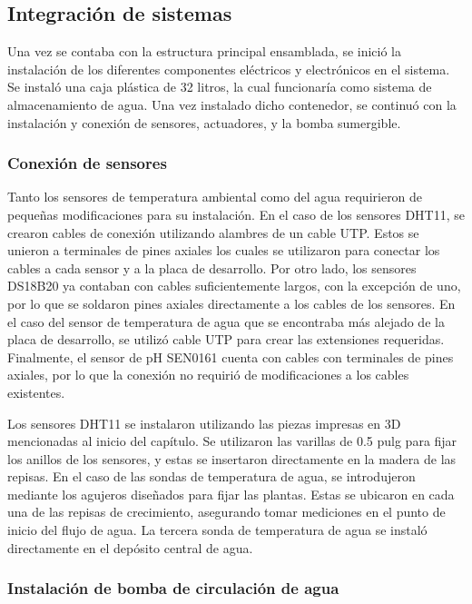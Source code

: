 \subsection{Integración de sistemas}

Una vez se contaba con la estructura principal ensamblada, se inició la instalación de los diferentes componentes eléctricos y electrónicos en el sistema. Se instaló una caja plástica de 32 litros, la cual funcionaría como sistema de almacenamiento de agua. Una vez instalado dicho contenedor, se continuó con la instalación y conexión de sensores, actuadores, y la bomba sumergible.

\subsubsection{Conexión de sensores}

Tanto los sensores de temperatura ambiental como del agua requirieron de pequeñas modificaciones para su instalación. En el caso de los sensores DHT11, se crearon cables de conexión utilizando alambres de un cable UTP. Estos se unieron a terminales de pines axiales los cuales se utilizaron para conectar los cables a cada sensor y a la placa de desarrollo. Por otro lado, los sensores DS18B20 ya contaban con cables suficientemente largos, con la excepción de uno, por lo que se soldaron pines axiales directamente a los cables de los sensores. En el caso del sensor de temperatura de agua que se encontraba más alejado de la placa de desarrollo, se utilizó cable UTP para crear las extensiones requeridas. Finalmente, el sensor de pH SEN0161 cuenta con cables con terminales de pines axiales, por lo que la conexión no requirió de modificaciones a los cables existentes.

Los sensores DHT11 se instalaron utilizando las piezas impresas en 3D mencionadas al inicio del capítulo. Se utilizaron las varillas de 0.5 pulg para fijar los anillos de los sensores, y estas se insertaron directamente en la madera de las repisas. En el caso de las sondas de temperatura de agua, se introdujeron mediante los agujeros diseñados para fijar las plantas. Estas se ubicaron en cada una de las repisas de crecimiento, asegurando tomar mediciones en el punto de inicio del flujo de agua. La tercera sonda de temperatura de agua se instaló directamente en el depósito central de agua. 

\subsubsection{Instalación de bomba de circulación de agua}

